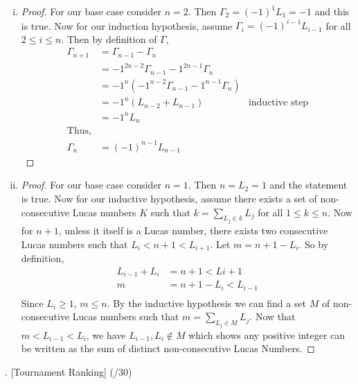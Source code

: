 \documentclass[11pt]{article}
\newenvironment{solution}{\begin{mdframed}[skipabove=\baselineskip,innertopmargin=\baselineskip,innerbottommargin=\baselineskip]
  }{\end{mdframed}}
\begin{document}
\begin{solution}
\begin{enumerate}[(i)]
    \item\begin{proof}
    For our base case consider $n=2$. Then $\Gamma_2 = (-1)^{1}L_{1} = -1$ and this is true. Now for our induction hypothesis, assume $\Gamma_i = (-1)^{i-1}L_{i-1} $ for all $2 \leq i\leq n$. Then by definition of $\Gamma$,
    \begin{align*}
        \Gamma_{n+1} &= \Gamma_{n-1} - \Gamma_{n} \\
        &= {-1}^{2n-2}\Gamma_{n-1} - 1^{2n-1}\Gamma_{n} \\
        &= {-1}^{n}({-1}^{n-2}\Gamma_{n-1} - 1^{n-1}\Gamma_{n}) \\
        &= {-1}^n(L_{n-2}+L_{n-1}) & \text{inductive step} \\
        &= -1^nL_n \\
        \text{Thus,} \\
        \Gamma_n &= (-1)^{n-1}L_{n-1}
    \end{align*}
    \end{proof}
    \item\begin{proof}
    For our base case consider $n=1$. Then $n = L_2 = 1$ and the statement is true. Now for our inductive hypothesis, assume there exists a set of non-consecutive Lucas numbers $K$ such that $k=\sum_{L_j \in k}L_j$ for all $1\leq k \leq n$. Now for $n+1$, unless it itself is a Lucas number, there exists two consecutive Lucas numbers such that $L_i < n+1 < L_{i+1}$. Let $m=n+1-L_i$. So by definition,
    \begin{align*}
        L_{i-1}+L_i &= n+1 < L{i+1} \\
        m &= n+1-L_i<L_{i-1} \\
    \end{align*}
    Since $L_i \geq 1$, $m \leq n$. By the inductive hypothesis we can find a set $M$ of non-consecutive Lucas numbers such that $m = \sum_{L_j \in M}L_j$. Now that $m<L_{i-1}<L_i$, we have $L_{i-1},L_i \notin M$ which shows any positive integer can be written as the sum of distinct non-consecutive Lucas Numbers.
    \end{proof}
\end{enumerate}
\end{solution}

\newpage

 . [Tournament Ranking] (/30)
 
\end{document}
